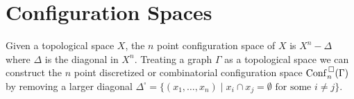 \chapter{Configuration Spaces}
Given a topological space \(X\), the \(n\) point configuration space of \(X\) is
\(X^n - \Delta\)
where \(\Delta\) is the diagonal in \(X^n\).
Treating a graph \(\Gamma\) as a topological space we can construct the
\(n\) point discretized or combinatorial configuration space \(\mathrm{Conf}^{\,\square}_n(\Gamma)\) by 
removing a larger diagonal \(\Delta^{\square} = \{(x_1, \ldots, x_n) \mid x_i \cap x_j = \emptyset \text{ for some } i \neq j\}\).

